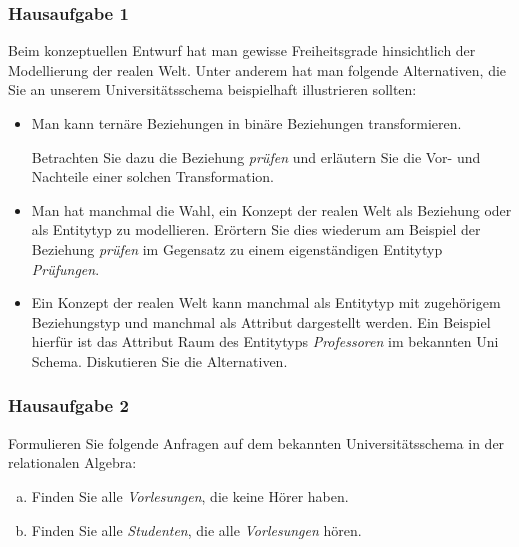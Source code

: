 \begin{frame}
	\frametitle{Hausaufgabe 1}
	\vspace{0.5cm}

	Beim konzeptuellen Entwurf hat man gewisse Freiheitsgrade hinsichtlich der Modellierung der realen Welt.
	Unter anderem hat man folgende Alternativen, die Sie an unserem Universitätsschema beispielhaft illustrieren sollten:

	\begin{itemize}
		\item Man kann ternäre Beziehungen in binäre Beziehungen transformieren.

		      Betrachten Sie dazu die Beziehung \textit{prüfen} und erläutern Sie die Vor- und Nachteile
		      einer solchen Transformation.
		\item Man hat manchmal die Wahl, ein Konzept der realen Welt als Beziehung
		      oder als Entitytyp zu modellieren. Erörtern Sie dies wiederum am Beispiel
		      der Beziehung \textit{prüfen} im Gegensatz zu einem eigenständigen Entitytyp \textit{Prüfungen}.
		\item Ein Konzept der realen Welt kann manchmal als Entitytyp mit zugehörigem
		      Beziehungstyp und manchmal als Attribut dargestellt werden.
		      Ein Beispiel hierfür ist das Attribut Raum des Entitytyps
		      \textit{Professoren} im bekannten Uni Schema. Diskutieren Sie die Alternativen.
	\end{itemize}
\end{frame}

\begin{frame}
	\frametitle{Hausaufgabe 2}
	\vspace{0.5cm}

	Formulieren Sie folgende Anfragen auf dem bekannten Universitätsschema in der relationalen Algebra:
	\begin{enumerate}[a)]
		\item Finden Sie alle \textit{Vorlesungen}, die keine Hörer haben.
		\item Finden Sie alle \textit{Studenten}, die alle \textit{Vorlesungen} hören.
	\end{enumerate}
\end{frame}

